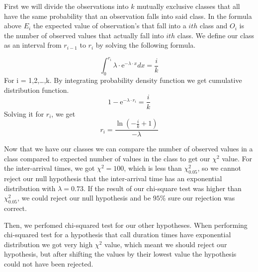 \documentclass[12pt,a4paper]{article}
\begin{document}
First we will divide the observations into $k$ mutually exclusive classes that all have the same probability that an observation falls into said class. In the formula above $E_i$ the expected value of observation's that fall into a $ith$ class and $O_i$ is the number of observed values that actually fall into $ith$ class. We define our class as an interval from $r_{i-1}$ to $r_i$ by solving the following formula.

\begin{equation} \int_{0}^{r_i}\lambda\cdot\mathrm{e}^{-\lambda\cdot x}dx = \frac{i}{k} \end{equation}
For i = 1,2,…,k. By integrating probability density function we get cumulative distribution function.
\begin{equation} 1 - \mathrm{e}^{-\lambda\cdot r_i} = \frac{i}{k} \end{equation}
Solving it for $r_i$, we get
\begin{equation} r_i = \frac{\ln(-\frac{i}{k} + 1)}{-\lambda} \end{equation}

Now that we have our classes we can compare the number of observed values in a class compared to expected number of values in the class to get our $\chi^2$ value. For the inter-arrival times, we got $\chi^2=100$, which is less than $\chi^2_{0.05}$, so we cannot reject our null hypothesis that the inter-arrival time has an exponential distribution with $\lambda=0.73$. If the result of our chi-square test was higher than $\chi^2_{0.05}$, we could reject our null hypothesis and be $95\%$ sure our rejection was correct.
\par \medskip
Then, we perfomed chi-squared test for our other hypotheses. When performing chi-squared test for a hypothesis that call duration times have exponential distribution we got very high $\chi^2$ value, which meant we should reject our hypothesis, but after shifting the values by their lowest value the hypothesis could not have been rejected.
\end{document}
